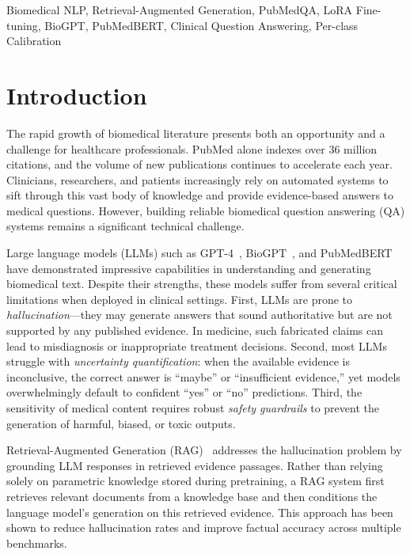 \documentclass[conference]{IEEEtran}
\begin{document}
\begin{IEEEkeywords}
Biomedical NLP, Retrieval-Augmented Generation, PubMedQA, LoRA Fine-tuning, BioGPT, PubMedBERT, Clinical Question Answering, Per-class Calibration
\end{IEEEkeywords}

\section{Introduction}

The rapid growth of biomedical literature presents both an opportunity and a challenge for healthcare professionals. PubMed alone indexes over 36 million citations, and the volume of new publications continues to accelerate each year. Clinicians, researchers, and patients increasingly rely on automated systems to sift through this vast body of knowledge and provide evidence-based answers to medical questions. However, building reliable biomedical question answering (QA) systems remains a significant technical challenge.

Large language models (LLMs) such as GPT-4~\cite{openai2023gpt4}, BioGPT~\cite{luo2022biogpt}, and PubMedBERT~\cite{gu2021domain} have demonstrated impressive capabilities in understanding and generating biomedical text. Despite their strengths, these models suffer from several critical limitations when deployed in clinical settings. First, LLMs are prone to \textit{hallucination}---they may generate answers that sound authoritative but are not supported by any published evidence. In medicine, such fabricated claims can lead to misdiagnosis or inappropriate treatment decisions. Second, most LLMs struggle with \textit{uncertainty quantification}: when the available evidence is inconclusive, the correct answer is ``maybe'' or ``insufficient evidence,'' yet models overwhelmingly default to confident ``yes'' or ``no'' predictions. Third, the sensitivity of medical content requires robust \textit{safety guardrails} to prevent the generation of harmful, biased, or toxic outputs.

Retrieval-Augmented Generation (RAG)~\cite{lewis2020retrieval} addresses the hallucination problem by grounding LLM responses in retrieved evidence passages. Rather than relying solely on parametric knowledge stored during pretraining, a RAG system first retrieves relevant documents from a knowledge base and then conditions the language model's generation on this retrieved evidence. This approach has been shown to reduce hallucination rates and improve factual accuracy across multiple benchmarks.
\end{document}
